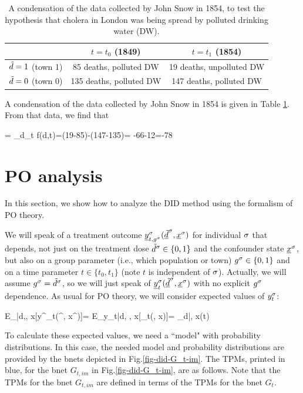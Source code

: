 \begin{table}[h!]
\centering
{\renewcommand{\arraystretch}{1.4}
\begin{tabular}{|c|c|c|}
\hline 
\rowcolor[HTML]{ECF4FF} 
 & $t=t_0 $ (1849) & $t=t_1$ (1854) \\ 
\hline
${\tilde{d}}=1 $ (town 1)\cellcolor[HTML]{ECF4FF}
&85 deaths, polluted DW&19 deaths, unpolluted DW\\
\hline 
${\tilde{d}}=0 $ (town 0)\cellcolor[HTML]{ECF4FF} 
&135 deaths, polluted DW& 147 deaths, polluted DW\\ 
\end{tabular}
}
\caption{A condensation of the data
collected by 
John Snow in 1854,
to test the hypothesis
that cholera in London was being spread by
polluted drinking water (DW).}
\label{tab-john-snow}
\end{table}

A condensation of the
data collected by John Snow in 1854
is given in Table \ref{tab-john-snow}.
From that data, we find that

\beq
\delta= \Delta_d\Delta_t f(d,t)=(19-85)-(147-135)=
-66-12=-78
\eeq



\section{PO analysis}
In this section,
we show how
to analyze the
DID method
using the formalism of PO theory.

We will speak of a treatment 
outcome
${\underline{y}}^\sigma_{t, g^\sigma}
({\underline{\tilde{d}}}^\sigma, {\underline{x}}^\sigma)$
for individual $\sigma$
that depends, not 
just on the treatment dose 
${\tilde{d}}^\sigma\in \{0,1\}$
and the confounder state ${\underline{x}}^\sigma$,
but also
on a group parameter (i.e., which population
or town)
$g^\sigma\in \{0,1\}$
and on a time parameter $t\in\{t_0, t_1\}$ 
(note $t$ is independent of $\sigma$).
Actually,
we will assume $g^\sigma={\tilde{d}}^\sigma$,
so we will just speak of
${\underline{y}}^\sigma_t({\underline{\tilde{d}}}^\sigma, {\underline{x}}^\sigma)$
with no explicit $g^\sigma$
dependence. As usual for PO theory,
we will consider
expected values of $y^\sigma_t$:


\beq
E_{\s|d,\td, x}[y^\s_t(\td^\s, x^\s)]=
 E_{y_t|d, \td, x}[\rvy_t(\td, x)]=
\caly_{d|\td, x}(t)
\eeq

To calculate these
expected values, we need a ``model"
with probability 
distributions.
In this case,
the needed model and probability
distributions are
provided by the
bnets depicted in Fig.\ref{fig-did-G_t-im}.
The TPMs,
printed in blue,
for the 
 bnet
$G_{t, im}$
in Fig.\ref{fig-did-G_t-im},
are as follows.
Note
that the
TPMs for the bnet $G_{t, im}$
are defined in 
terms
of the TPMs for the bnet $G_t$.


